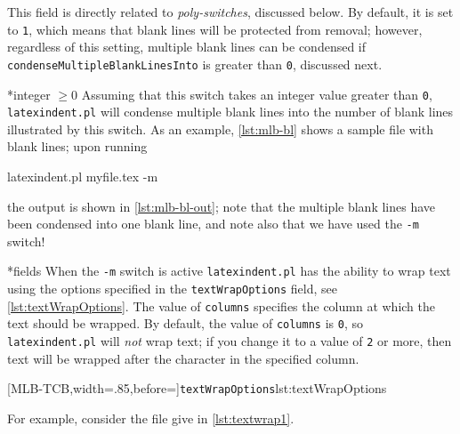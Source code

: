 	This field is directly related to \emph{poly-switches}, discussed below.
	By default, it is set to \texttt{1}, which means that blank lines will
	be protected from removal; however, regardless of this setting, multiple
	blank lines can be condensed if \texttt{condenseMultipleBlankLinesInto} is
	greater than \texttt{0}, discussed next.

*{integer $\geq 0$}
	Assuming that this switch takes an integer value greater than \texttt{0}, \texttt{latexindent.pl} will condense multiple blank lines into
	the number of blank lines illustrated by this switch. As an example, \cref{lst:mlb-bl} shows a sample file
	with blank lines; upon running
	\begin{commandshell}
latexindent.pl myfile.tex -m  
\end{commandshell}
	the output is shown in \cref{lst:mlb-bl-out}; note that the multiple blank lines have been
	condensed into one blank line, and note also that we have used the \texttt{-m} switch!

	\begin{minipage}{.45\textwidth}
	\end{minipage}%
	\hfill
	\begin{minipage}{.45\textwidth}
	\end{minipage}

*{fields}
	When the \texttt{-m} switch is active \texttt{latexindent.pl} has the ability to wrap text using the options
	specified in the \texttt{textWrapOptions} field, see \cref{lst:textWrapOptions}. The value of
	\texttt{columns} specifies the column at which the text should be wrapped.
	By default, the value of \texttt{columns} is \texttt{0}, so \texttt{latexindent.pl}
	will \emph{not} wrap text; if you change it to a value of \texttt{2} or more, then
	text will be wrapped after the character in the specified column.

	[MLB-TCB,width=.85\linewidth,before=\centering]{\texttt{textWrapOptions}}{lst:textWrapOptions}

	For example, consider the file give in \cref{lst:textwrap1}.

	\begin{widepage}
	\end{widepage}

